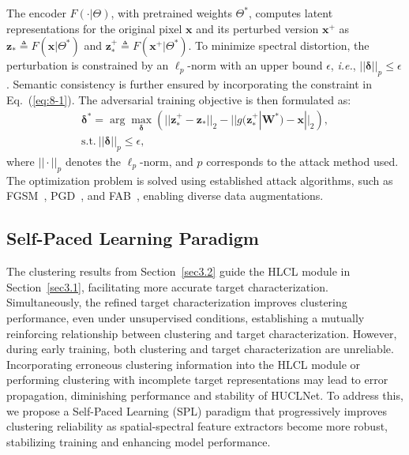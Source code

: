The encoder $F(\cdot|\Theta)$, with pretrained weights $\Theta^{\ast}$, computes latent representations for the original pixel $\bm{x}$ and its perturbed version $\bm{x}^+$ as $\bm{z}_{\ast} \triangleq F(\bm{x}|\Theta^{\ast})$ and $\bm{z}_{\ast}^+ \triangleq F(\bm{x}^+|\Theta^{\ast})$. To minimize spectral distortion, the perturbation is constrained by an $\ell_p$-norm with an upper bound $\epsilon$, \emph{i.e.}, $||\bm{\delta}||_p \leq \epsilon$. Semantic consistency is further ensured by incorporating the constraint in Eq.~(\ref{eq:8-1}). The adversarial training objective is then formulated as:
\begin{equation}\label{eq:9}        
    \begin{gathered}      
        \bm{\delta}^{\ast} = \arg\max\limits_{\bm{\delta}} \left( ||\bm{z}^+_{\ast} - \bm{z}_{\ast}||_2 - ||g(\bm{z}^+_{\ast}|\bm{W}^{\ast}) - \bm{x}||_2 \right), \\
        \text{s.t.} \ ||\bm{\delta}||_p \leq \epsilon,
    \end{gathered}   
\end{equation}
where $||\cdot||_p$ denotes the $\ell_p$-norm, and $p$ corresponds to the attack method used. The optimization problem is solved using established attack algorithms, such as FGSM~\cite{GoodfellowSS14}, PGD~\cite{MadryMSTV18}, and FAB~\cite{Croce020}, enabling diverse data augmentations.
\par
\subsection{Self-Paced Learning Paradigm}\label{sec3.3}
The clustering results from Section~\ref{sec3.2} guide the HLCL module in Section~\ref{sec3.1}, facilitating more accurate target characterization. 
Simultaneously, the refined target characterization improves clustering performance, even under unsupervised conditions, establishing a mutually reinforcing relationship between clustering and target characterization. However, during early training, both clustering and target characterization are unreliable. Incorporating erroneous clustering information into the HLCL module or performing clustering with incomplete target representations may lead to error propagation, diminishing performance and stability of HUCLNet. To address this, we propose a Self-Paced Learning (SPL) paradigm that progressively improves clustering reliability as spatial-spectral feature extractors become more robust, stabilizing training and enhancing model performance.

